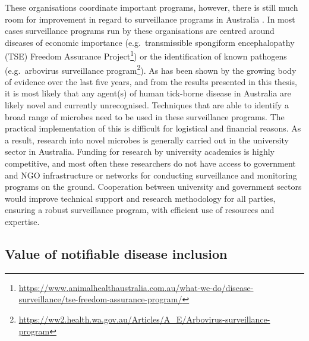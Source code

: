 \documentclass[a4paper, nobind]{templates/ociamthesis}
\begin{document}
These organisations coordinate important programs, however, there is still much room for improvement in regard to surveillance programs in Australia \autocite{woodsImportanceWildlifeDisease2019}.
In most cases surveillance programs run by these organisations are centred around diseases of economic importance (e.g.~transmissible spongiform encephalopathy (TSE) Freedom Assurance Project\footnote{\url{https://www.animalhealthaustralia.com.au/what-we-do/disease-surveillance/tse-freedom-assurance-program/}}) or the identification of known pathogens (e.g.~arbovirus surveillance program\footnote{\url{https://ww2.health.wa.gov.au/Articles/A_E/Arbovirus-surveillance-program}}).
As has been shown by the growing body of evidence over the last five years, and from the results presented in this thesis, it is most likely that any agent(s) of human tick-borne disease in Australia are likely novel and currently unrecognised.
Techniques that are able to identify a broad range of microbes need to be used in these surveillance programs.
The practical implementation of this is difficult for logistical and financial reasons.
As a result, research into novel microbes is generally carried out in the university sector in Australia.
Funding for research by university academics is highly competitive, and most often these researchers do not have access to government and NGO infrastructure or networks for conducting surveillance and monitoring programs on the ground.
Cooperation between university and government sectors would improve technical support and research methodology for all parties, ensuring a robust surveillance program, with efficient use of resources and expertise.

\hypertarget{value-of-notifiable-disease-inclusion}{%
\subsection{Value of notifiable disease inclusion}\label{value-of-notifiable-disease-inclusion}}
\end{document}
